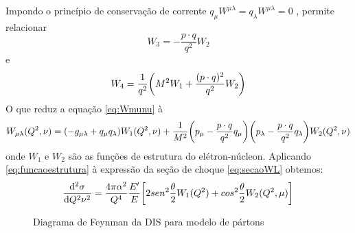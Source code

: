 Impondo o princípio de conservação de corrente $q_\mu W^{\mu\lambda} = q_ \lambda W^{\mu\lambda} = 0$ , permite relacionar
\begin{equation}
    W_ 3 = - \frac{p\cdot q}{q^2} W_ 2
\end{equation}
e 
\begin{equation}
    W_ 4 = \frac{1}{q^2} \qty(M^2 W_1 + \frac{(p\cdot q) ^2}{q^2} W_ 2)
\end{equation}
O que reduz a equação \eqref{eq:Wmunu} à
\begin{equation}
    W_{\mu\lambda} (Q^2, \nu) =\qty (-g_{\mu\lambda} + q_\mu q_\lambda)W_ 1(Q^2,\nu) + \frac{1}{M^2} \qty(p_\mu - \frac{p\cdot q }{q^2}q_ \mu)\qty(p_\lambda - \frac{p\cdot q }{q^2}q_ \lambda) W_2(Q^2, \nu)
    \label{eq:funcaoestrutura}
\end{equation}
onde $W_1$ e $W_2$ são as funções de estrutura do elétron-núcleon. Aplicando \eqref{eq:funcaoestrutura} à expressão da seção de choque \eqref{eq:secaoWL} obtemos:
\begin{equation}
    \dv[2]{\sigma}{Q^2 \nu} = \frac{4\pi \alpha^2}{Q^4} \frac{E'}{E}\qty[2sen^2\frac{\theta}{2} W_1(Q^2) + cos^2\frac{\theta}{2}W_ 2 (Q^2,\mu)]
    \label{eq:crosssectiondis}
\end{equation}
\begin{figure}[h!]
	\centering
\caption{Diagrama de Feynman da DIS para modelo de pártons}
\label{fig:disparton}
\end{figure}
